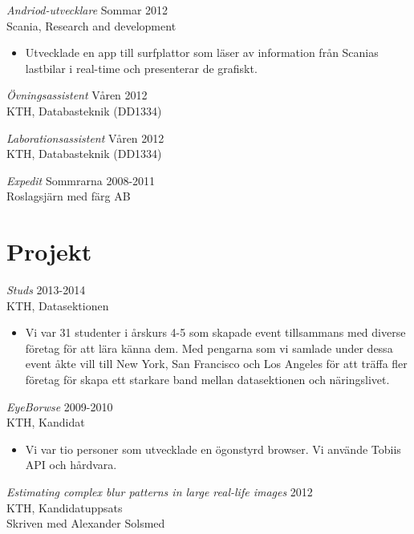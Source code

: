 \documentclass[margin, 10pt]{res} %
\begin{document}
\begin{resume}
{\sl Andriod-utvecklare} \hfill Sommar 2012 \\
Scania, Research and development
\begin{itemize} 
\item Utvecklade en app till surfplattor som läser av information från Scanias lastbilar i real-time och presenterar de grafiskt.
\end{itemize} 

{\sl Övningsassistent} \hfill Våren 2012 \\
KTH, Databasteknik (DD1334)

{\sl Laborationsassistent} \hfill Våren 2012 \\
KTH, Databasteknik (DD1334)

{\sl Expedit} \hfill Sommrarna 2008-2011 \\
Roslagsjärn med färg AB


\section{Projekt}

{\sl Studs} \hfill 2013-2014 \\
KTH, Datasektionen
\begin{itemize} 
\item Vi var 31 studenter i årskurs 4-5 som skapade event tillsammans med diverse företag för att lära känna dem. Med pengarna som vi samlade under dessa event åkte vill till New York, San Francisco och Los Angeles för att träffa fler företag för skapa ett starkare band mellan datasektionen och näringslivet.
\end{itemize} 

{\sl EyeBorwse} \hfill 2009-2010 \\
KTH, Kandidat
\begin{itemize} 
\item Vi var tio personer som utvecklade en ögonstyrd browser. Vi använde Tobiis API och hårdvara.
\end{itemize} 

{\sl Estimating complex blur patterns in large real-life images} \hfill 2012 \\
KTH, Kandidatuppsats \\
Skriven med Alexander Solsmed




\end{resume}
\end{document}
